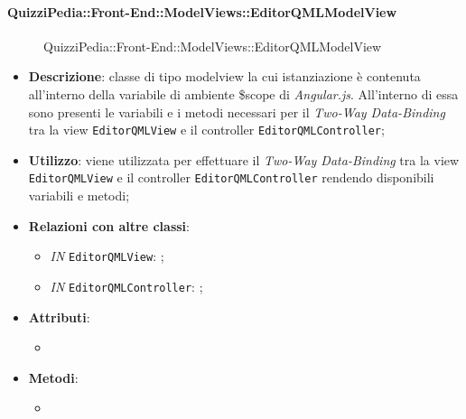 \paragraph{QuizziPedia::Front-End::ModelViews::EditorQMLModelView}
\begin{figure} [ht]
	\centering
	\caption{QuizziPedia::Front-End::ModelViews::EditorQMLModelView}
\end{figure} \FloatBarrier
\begin{itemize}
	\item \textbf{Descrizione}: classe di tipo modelview la cui istanziazione è contenuta all'interno della variabile di ambiente \$scope di \textit{Angular.js}. All'interno di essa sono presenti le variabili e i metodi necessari per il \textit{Two-Way Data-Binding} tra la view \texttt{EditorQMLView} e il controller \texttt{EditorQMLController}; 
	\item \textbf{Utilizzo}: viene utilizzata per effettuare il \textit{Two-Way Data-Binding} tra la view \texttt{EditorQMLView} e il controller \texttt{EditorQMLController} rendendo disponibili variabili e metodi;
	\item \textbf{Relazioni con altre classi}:
	\begin{itemize}
		\item \textit{IN} \texttt{EditorQMLView}: ; 
		\item \textit{IN} \texttt{EditorQMLController}: ;
	\end{itemize}
	\item \textbf{Attributi}:
	\begin{itemize}
		\item
	\end{itemize}
	\item \textbf{Metodi}:
	\begin{itemize}
		\item 
	\end{itemize}
\end{itemize}



